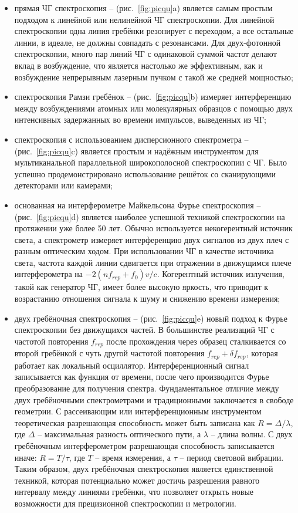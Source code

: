\begin{itemize}
  \item прямая ЧГ спектроскопия \--- (рис.~\ref{fig:picqu}a) является самым простым подходом к линейной или нелинейной ЧГ спектроскопии. Для линейной спектроскопии одна линия гребёнки резонирует с переходом, а все остальные линии, в идеале, не должны совпадать с резонансами. Для двух-фотонной спектроскопии, много пар линий ЧГ с одинаковой суммой частот делают вклад в возбуждение, что является настолько же эффективным, как и возбуждение непрерывным лазерным пучком с такой же средней мощностью; 
  \item спектроскопия Рамзи гребёнок \--- (рис.~\ref{fig:picqu}b) измеряет интерференцию между возбуждениями атомных или молекулярных образцов с помощью двух интенсивных задержанных во времени импульсов, выведенных из ЧГ;
  \item спектроскопия с использованием дисперсионного спектрометра \--- (рис.~\ref{fig:picqu}c) является простым и надёжным инструментом для мультиканальной параллельной широкополосной спектроскопии с ЧГ. Было успешно продемонстрировано использование решёток со сканирующими детекторами или камерами;
  \item основанная на интерферометре Майкельсона Фурье спектроскопия \--- (рис.~\ref{fig:picqu}d) является наиболее успешной техникой спектроскопии на протяжении уже более 50 лет. Обычно используется некогерентный источник света, а спектрометр измеряет интерференцию двух сигналов из двух плеч с разным оптическим ходом. При использовании ЧГ в качестве источника света, частота каждой линии сдвигается при отражении в движущимся плече интерферометра на $-2(nf_{rep}+f_0)v/c$. Когерентный источник излучения, такой как генератор ЧГ, имеет более высокую яркость, что приводит к возрастанию отношения сигнала к шуму и снижению времени измерения;
  \item двух гребёночная спектроскопия \--- (рис.~\ref{fig:picqu}e) новый подход к Фурье спектроскопии без движущихся частей. В большинстве реализаций ЧГ с частотой повторения $f_{rep}$ после прохождения через образец сталкивается со второй гребёнкой с чуть другой частотой повторения $f_{rep}+\delta f_{rep}$, которая работает как локальный осциллятор. Интерференционный сигнал записывается как функция от времени, после чего производится Фурье преобразование для получения спектра. Фундаментальное отличие между двух гребёночными спектрометрами и традиционными заключается в свободе геометрии. С рассеивающим или интерференционным инструментом теоретическая разрешающая способность может быть записана как $R = \Delta/\lambda$, где $\Delta$ \--- максимальная разность оптического пути, а $\lambda$ \--- длина волны. С двух гребёночным интерферометром разрешающая способность записывается иначе: $R = T/\tau$, где $T$ \--- время измерения, а $\tau$ \--- период световой вибрации. Таким образом, двух гребёночная спектроскопия является единственной техникой, которая потенциально может достичь разрешения равного интервалу между линиями гребёнки, что позволяет открыть новые возможности для прецизионной спектроскопии и метрологии. 
\end{itemize}

